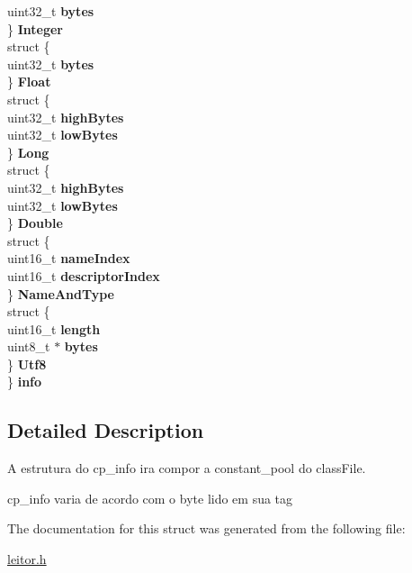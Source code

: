 \begin{DoxyCompactItemize}
\begin{tabbing}
\>\>uint32\_t {\bfseries bytes}\\
\>\} {\bfseries Integer}\\
\>struct \{\\
\>\>uint32\_t {\bfseries bytes}\\
\>\} {\bfseries Float}\\
\>struct \{\\
\>\>uint32\_t {\bfseries highBytes}\\
\>\>uint32\_t {\bfseries lowBytes}\\
\>\} {\bfseries Long}\\
\>struct \{\\
\>\>uint32\_t {\bfseries highBytes}\\
\>\>uint32\_t {\bfseries lowBytes}\\
\>\} {\bfseries Double}\\
\>struct \{\\
\>\>uint16\_t {\bfseries nameIndex}\\
\>\>uint16\_t {\bfseries descriptorIndex}\\
\>\} {\bfseries NameAndType}\\
\>struct \{\\
\>\>uint16\_t {\bfseries length}\\
\>\>uint8\_t $\ast$ {\bfseries bytes}\\
\>\} {\bfseries Utf8}\\
\} {\bfseries info}\\

\end{tabbing}\end{DoxyCompactItemize}


\subsection{Detailed Description}
A estrutura do cp\+\_\+info ira compor a constant\+\_\+pool do class\+File. 

cp\+\_\+info varia de acordo com o byte lido em sua tag 

The documentation for this struct was generated from the following file\+:\begin{DoxyCompactItemize}
\item 
\mbox{\hyperlink{leitor_8h}{leitor.\+h}}\end{DoxyCompactItemize}
